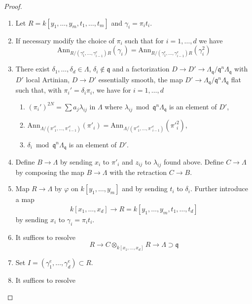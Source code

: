 \begin{proof}
\begin{enumerate}
regular system of parameters of $k[y_1, \ldots, y_m]_\mathfrak p$.
\item
\label{smoothing-item-set-R}
Let $R = k[y_1, \ldots, y_m, t_1, \ldots, t_m]$ and $\gamma_i = \pi_i t_i$.
\item
\label{smoothing-item-modify-pii}
If necessary modify the choice of $\pi_i$ such that
for $i = 1, \ldots, d$ we have
$$
\text{Ann}_{R/(\gamma_1^e, \ldots, \gamma_{i - 1}^e)R}(\gamma_i)
=
\text{Ann}_{R/(\gamma_1^e, \ldots, \gamma_{i - 1}^e)R}(\gamma_i^2)
$$
\item
\label{smoothing-item-choose-deltai}
There exist $\delta_1, \ldots, \delta_d \in \Lambda$,
$\delta_i \not \in \mathfrak q$ and a factorization
$D \to D' \to \Lambda_\mathfrak q/\mathfrak q^n\Lambda_\mathfrak q$
with $D'$ local Artinian, $D \to D'$ essentially smooth, the map
$D' \to \Lambda_\mathfrak q/\mathfrak q^n\Lambda_\mathfrak q$
flat such that, with $\pi_i' = \delta_i \pi_i$, we have for
$i = 1, \ldots, d$
\begin{enumerate}
\item $(\pi_i')^{2N} = \sum a_j\lambda_{ij}$ in $\Lambda$ where
$\lambda_{ij} \bmod \mathfrak q^n\Lambda_\mathfrak q$ is an element of $D'$,
\item $\text{Ann}_{\Lambda/({\pi'}_1^e, \ldots, {\pi'}_{i - 1}^e)}({\pi'}_i) =
\text{Ann}_{\Lambda/({\pi'}_1^e, \ldots, {\pi'}_{i - 1}^e)}({\pi'}_i^2)$,
\item $\delta_i \bmod \mathfrak q^n\Lambda_\mathfrak q$ is an element of $D'$.
\end{enumerate}
\item
\label{smoothing-item-map-B-Lambda}
Define $B \to \Lambda$ by sending $x_i$ to $\pi'_i$ and
$z_{ij}$ to $\lambda_{ij}$ found above. Define $C \to \Lambda$
by composing the map $B \to \Lambda$ with the retraction $C \to B$.
\item
\label{smoothing-item-set-map-R}
Map $R \to \Lambda$ by $\varphi$ on $k[y_1, \ldots, y_m]$
and by sending $t_i$ to $\delta_i$. Further introduce a map
$$
k[x_1, \ldots, x_d]
\longrightarrow
R = k[y_1, \ldots, y_m, t_1, \ldots, t_d]
$$
by sending $x_i$ to $\gamma_i = \pi_i t_i$.
\item
\label{smoothing-item-first-solve}
It suffices to resolve
$$
R
\to
C \otimes_{k[x_1, \ldots, x_d]} R
\to
\Lambda \supset \mathfrak q
$$
\item
\label{smoothing-item-set-I}
Set $I = (\gamma_1^e, \ldots, \gamma_d^e) \subset R$.
\item
\label{smoothing-item-second-resolve}
It suffices to resolve

\end{enumerate}
\end{proof}
